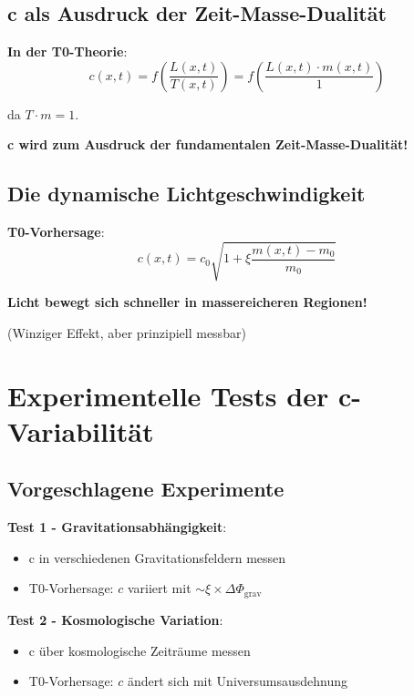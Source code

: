 \documentclass[12pt,a4paper]{article}
\newcommand{\Tfield}{T}
\newcommand{\xipar}{\xi}
\begin{document}
	\subsection{c als Ausdruck der Zeit-Masse-Dualität}
	
	\textbf{In der T0-Theorie}:
	\begin{equation}
		c(x,t) = f\left(\frac{L(x,t)}{\Tfield(x,t)}\right) = f\left(\frac{L(x,t) \cdot m(x,t)}{1}\right)
	\end{equation}
	
	da $\Tfield \cdot m = 1$.
	
	\textbf{c wird zum Ausdruck der fundamentalen Zeit-Masse-Dualität!}
	
	\subsection{Die dynamische Lichtgeschwindigkeit}
	
	\textbf{T0-Vorhersage}: 
	\begin{equation}
		c(x,t) = c_0 \sqrt{1 + \xipar \frac{m(x,t) - m_0}{m_0}}
	\end{equation}
	
	\textbf{Licht bewegt sich schneller in massereicheren Regionen!}
	
	(Winziger Effekt, aber prinzipiell messbar)
	
	\section{Experimentelle Tests der c-Variabilität}
	
	\subsection{Vorgeschlagene Experimente}
	
	\textbf{Test 1 - Gravitationsabhängigkeit}:
	\begin{itemize}
		\item c in verschiedenen Gravitationsfeldern messen
		\item T0-Vorhersage: $c$ variiert mit $\sim \xipar \times \Delta\Phi_{\text{grav}}$
	\end{itemize}
	
	\textbf{Test 2 - Kosmologische Variation}:
	\begin{itemize}
		\item c über kosmologische Zeiträume messen
		\item T0-Vorhersage: $c$ ändert sich mit Universumsausdehnung
	\end{itemize}
	
\end{document}
